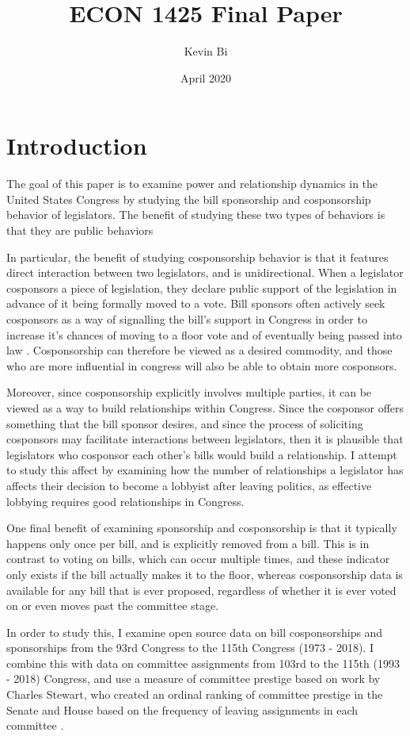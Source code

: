 \documentclass{article}
\title{ECON 1425 Final Paper}
\author{Kevin Bi}
\date{April 2020}
\begin{document}
\maketitle

\section{Introduction}
The goal of this paper is to examine power and relationship dynamics in the United States Congress by studying the bill sponsorship and cosponsorship behavior of legislators. The benefit of studying these two types of behaviors is that they are public behaviors 


In particular, the benefit of studying cosponsorship behavior is that it features direct interaction between two legislators, and is unidirectional. When a legislator cosponsors a piece of legislation, they declare public support of the legislation in advance of it being formally moved to a vote. Bill sponsors often actively seek cosponsors as a way of signalling the bill's support in Congress in order to increase it's chances of moving to a floor vote and of eventually being passed into law \cite{crs_sponsorship}. Cosponsorship can therefore be viewed as a desired commodity, and those who are more influential in congress will also be able to obtain more cosponsors. 

Moreover, since cosponsorship explicitly involves multiple parties, it can be viewed as a way to build relationships within Congress. Since the cosponsor offers something that the bill sponsor desires, and since the process of soliciting cosponsors may facilitate interactions between legislators, then it is plausible that legislators who cosponsor each other's bills would build a relationship. I attempt to study this affect by examining how the number of relationships a legislator has affects their decision to become a lobbyist after leaving politics, as effective lobbying requires good relationships in Congress. 

One final benefit of examining sponsorship and cosponsorship is that it typically happens only once per bill, and is explicitly removed from a bill. This is in contrast to voting on bills, which can occur multiple times, and these indicator only exists if the bill actually makes it to the floor, whereas cosponsorship data is available for any bill that is ever proposed, regardless of whether it is ever voted on or even moves past the committee stage. 

In order to study this, I examine open source data on bill cosponsorships and sponsorships from the 93rd Congress to the 115th Congress (1973 - 2018). I combine this with data on committee assignments from 103rd to the 115th (1993 - 2018) Congress, and use a measure of committee prestige based on work by Charles Stewart, who created an ordinal ranking of committee prestige in the Senate and House based on the frequency of leaving assignments in each committee \cite{stewart-committee-values}.
\end{document}
